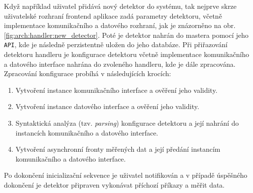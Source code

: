 Když například uživatel přidává nový detektor do systému, tak nejprve skrze uživatelské rozhraní frontend aplikace zadá parametry detektoru, včetně implementace komunikačního a datového rozhraní, jak je znázorněno na obr. \ref{fig:arch:handler:new_detector}. Poté je detektor nahrán do mastera pomocí jeho \texttt{API}, kde je následně perzistentně uložen do jeho databáze. Při přiřazování detektoru handleru je konfigurace detektoru včetně implementace komunikačního a datového interface nahrána do zvoleného handleru, kde je dále zpracována. Zpracování konfigurace probíhá v následujících krocích:
\begin{enumerate}
    \item Vytvoření instance komunikačního interface a ověření jeho validity.
    \item Vytvoření instance datového interface a ověření jeho validity.
    \item Syntaktická analýza (tzv. \textit{parsing}) konfigurace detektoru a její nahrání do instancích komunikačního a datového interface.
    \item Vytvoření asynchronní fronty měřených dat a její předání instancím komunikačního a datového interface.
\end{enumerate}
Po dokončení inicializační sekvence je uživatel notifikován a v případě úspěšného dokončení je detektor připraven vykonávat příchozí příkazy a měřit data.


